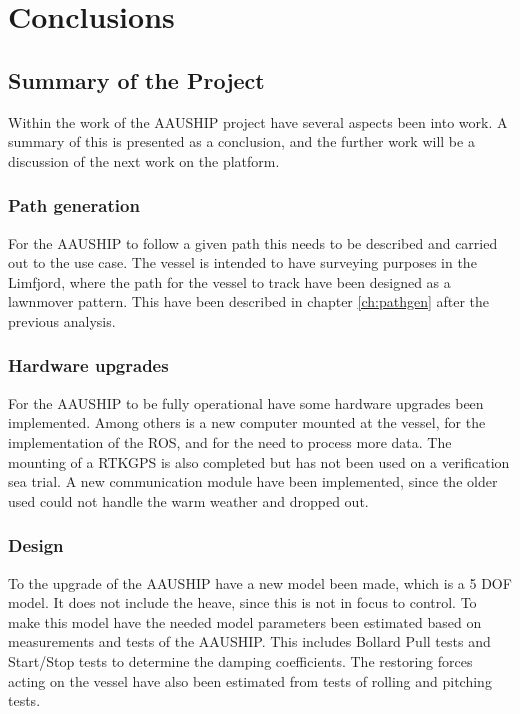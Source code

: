 \chapter{Conclusions}
\label{sc:FW}

\section{Summary of the Project}
Within the work of the AAUSHIP project have several aspects been into work. A summary of this is presented as a conclusion, and the further work will be a discussion of the next work on the platform.

\subsection{Path generation}
For the AAUSHIP to follow a given path this needs to be described and carried out to the use case. The vessel is intended to have surveying purposes in the Limfjord, where the path for the vessel to track have been designed as a lawnmover pattern. This have been described in chapter \ref{ch:pathgen} after the previous analysis.

\subsection{Hardware upgrades}
For the AAUSHIP to be fully operational have some hardware upgrades been implemented. Among others is a new computer mounted at the vessel, for the implementation of the \ac{ROS}, and for the need to process more data. The mounting of a \ac{RTK}\ac{GPS} is also completed but has not been used on a verification sea trial. A new communication module have been implemented, since the older used could not handle the warm weather and dropped out.

\subsection{Design}
To the upgrade of the AAUSHIP have a new model been made, which is a 5 \ac{DOF} model. It does not include the heave, since this is not in focus to control. To make this model have the needed model parameters been estimated based on measurements and tests of the AAUSHIP. This includes Bollard Pull tests and Start/Stop tests to determine the damping coefficients. The restoring forces acting on the vessel have also been estimated from tests of rolling and pitching tests.

